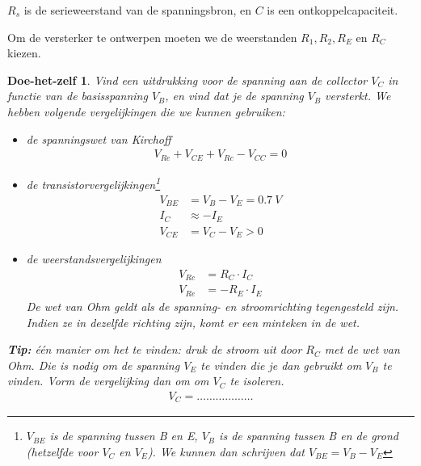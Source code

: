 \documentclass{article}
\newtheorem{DIY}{Doe-het-zelf}
\begin{document}
				$R_s$ is de serieweerstand van de spanningsbron, en $C$ is een ontkoppelcapaciteit.
		
				Om de versterker te ontwerpen moeten we de weerstanden $R_1,R_2,R_E$ en $R_C$ kiezen.

				\begin{DIY} Vind een uitdrukking voor de spanning aan de collector $V_C$ in functie van de basisspanning $V_B$, en vind dat je de spanning $V_B$ versterkt. We hebben volgende vergelijkingen die we kunnen gebruiken:
				\begin{itemize}
					\item de spanningswet van Kirchoff
					\begin{align}
					V_{Re} + V_{CE} + V_{Rc} - V_{CC} = 0    
					\end{align}
					\item de transistorvergelijkingen\footnote{ $V_{BE}$  is de spanning tussen B en E, $V_{B}$ is de spanning tussen B en de grond (hetzelfde voor $V_C$ en $V_E$). We kunnen dan schrijven dat $ V_{BE} = V_{B} - V_{E} $}
					\begin{align}
				    V_{BE} &= V_{B} - V_{E} = 0.7~V \\
				     I_C&\approx -I_E \\
				    V_{CE} &= V_C - V_E > 0
					\end{align}
					\item de weerstandsvergelijkingen
					\begin{align}
				   	V_{Rc} &= R_C \cdot I_C \\
				   	V_{Re} &= - R_E \cdot  I_E
					\end{align}
					De wet van Ohm geldt als de spanning- en stroomrichting tegengesteld zijn. Indien ze in dezelfde richting zijn, komt er een minteken in de wet.
				\end{itemize}

				\textbf{Tip:} \'e\'en manier om het te vinden: druk de stroom uit door $R_C$ met de wet van Ohm. Die is nodig om de spanning $V_E$ te vinden die je dan gebruikt om $V_B$ te vinden. Vorm de vergelijking dan om om $V_C$ te isoleren.
				\begin{align}
				    V_C = \ldots \ldots \ldots \ldots  \ldots  \ldots 
				\end{align}
\vspace{30ex}
				\end{DIY}
\end{document}
